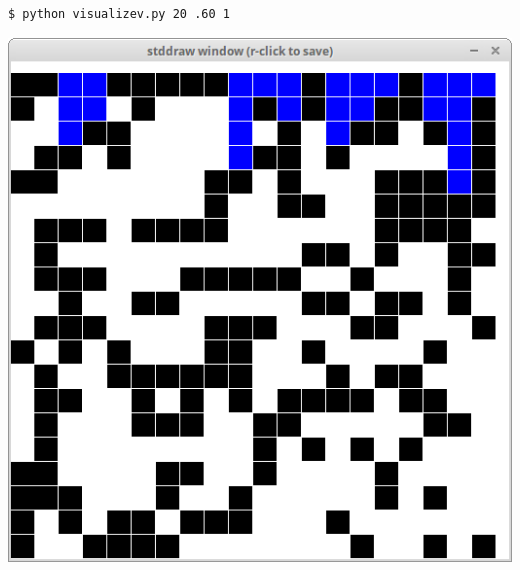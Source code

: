 \documentclass[8pt,a4paper,compress,handout]{beamer}
\begin{document}
\begin{frame}[fragile]
\begin{minipage}{160pt}
\begin{lstlisting}[language={}]
$ python visualizev.py 20 .60 1
\end{lstlisting}
\end{minipage}%
\begin{minipage}{140pt}
\hfill \includegraphics[scale=0.15]{figures/percolation5.png}
\end{minipage}

\smallskip


\end{frame}
\end{document}
